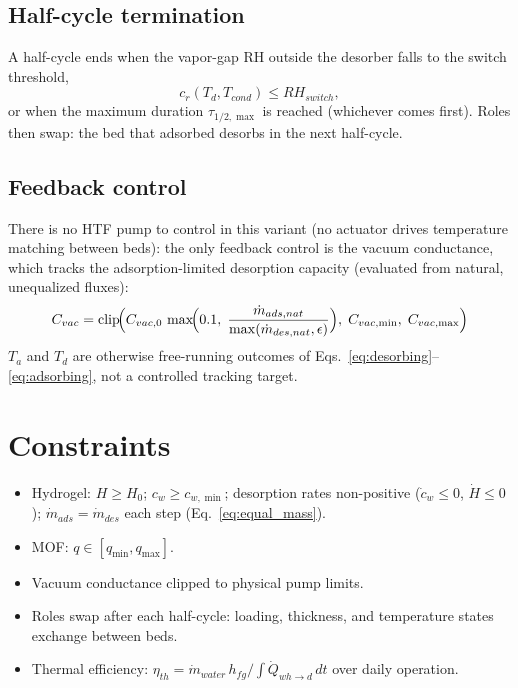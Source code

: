 \documentclass[11pt]{article}
\begin{document}
\subsection{Half-cycle termination}

A half-cycle ends when the vapor-gap RH outside the desorber falls to the switch threshold,
\begin{equation}
c_r(T_d, T_{cond}) \le RH_{switch},
\label{eq:rh_switch}
\end{equation}
or when the maximum duration $\tau_{1/2,\max}$ is reached (whichever comes first).
Roles then swap: the bed that adsorbed desorbs in the next half-cycle.

\subsection{Feedback control}

There is no HTF pump to control in this variant (no actuator drives temperature matching between beds): the only feedback control is the vacuum conductance, which tracks the adsorption-limited desorption capacity (evaluated from natural, unequalized fluxes):
\begin{equation}
C_{vac} = \mathrm{clip}\!\Bigl(
C_{vac,0}\,\max\!\Bigl(0.1,\; \frac{\dot{m}_{ads,nat}}{\max(\dot{m}_{des,nat}, \epsilon)}\Bigr),\;
C_{vac,\min},\; C_{vac,\max}\Bigr)
\label{eq:ctrl_cvac}
\end{equation}
$T_a$ and $T_d$ are otherwise free-running outcomes of Eqs.~\eqref{eq:desorbing}--\eqref{eq:adsorbing}, not a controlled tracking target.

\section{Constraints}

\begin{itemize}
\item Hydrogel: $H \ge H_0$; $c_w \ge c_{w,\min}$; desorption rates non-positive ($\dot{c}_w \le 0$, $\dot{H} \le 0$); $\dot{m}_{ads} = \dot{m}_{des}$ each step (Eq.~\eqref{eq:equal_mass}).
\item MOF: $q \in [q_{\min}, q_{\max}]$.
\item Vacuum conductance clipped to physical pump limits.
\item Roles swap after each half-cycle: loading, thickness, and temperature states exchange between beds.
\item Thermal efficiency: $\eta_{th} = \dot{m}_{water}\,h_{fg} / \int \dot{Q}_{wh\to d}\,dt$ over daily operation.
\end{itemize}
\end{document}
